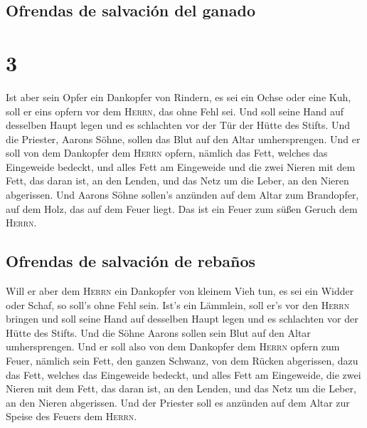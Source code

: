 \hypertarget{ofrendas-de-salvaciuxf3n-del-ganado}{%
\subsection{Ofrendas de salvación del
ganado}\label{ofrendas-de-salvaciuxf3n-del-ganado}}

\hypertarget{section-2}{%
\section{3}\label{section-2}}

 Ist aber sein Opfer ein Dankopfer von Rindern, es sei ein
Ochse oder eine Kuh, soll er eins opfern vor dem \textsc{Herrn}, das
ohne Fehl sei.  Und soll seine Hand auf desselben Haupt
legen und es schlachten vor der Tür der Hütte des Stifts. Und die
Priester, Aarons Söhne, sollen das Blut auf den Altar umhersprengen.
 Und er soll von dem Dankopfer dem \textsc{Herrn} opfern,
nämlich das Fett, welches das Eingeweide bedeckt, und alles Fett am
Eingeweide  und die zwei Nieren mit dem Fett, das daran
ist, an den Lenden, und das Netz um die Leber, an den Nieren abgerissen.
 Und Aarons Söhne sollen's anzünden auf dem Altar zum
Brandopfer, auf dem Holz, das auf dem Feuer liegt. Das ist ein Feuer zum
süßen Geruch dem \textsc{Herrn}.

\hypertarget{ofrendas-de-salvaciuxf3n-de-rebauxf1os}{%
\subsection{Ofrendas de salvación de
rebaños}\label{ofrendas-de-salvaciuxf3n-de-rebauxf1os}}

 Will er aber dem \textsc{Herrn} ein Dankopfer von kleinem
Vieh tun, es sei ein Widder oder Schaf, so soll's ohne Fehl sein.
 Ist's ein Lämmlein, soll er's vor den \textsc{Herrn}
bringen  und soll seine Hand auf desselben Haupt legen und
es schlachten vor der Hütte des Stifts. Und die Söhne Aarons sollen sein
Blut auf den Altar umhersprengen.  Und er soll also von
dem Dankopfer dem \textsc{Herrn} opfern zum Feuer, nämlich sein Fett,
den ganzen Schwanz, von dem Rücken abgerissen, dazu das Fett, welches
das Eingeweide bedeckt, und alles Fett am Eingeweide, 
die zwei Nieren mit dem Fett, das daran ist, an den Lenden, und das Netz
um die Leber, an den Nieren abgerissen.  Und der Priester
soll es anzünden auf dem Altar zur Speise des Feuers dem \textsc{Herrn}.


